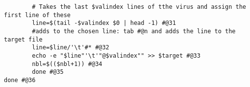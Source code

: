 \documentclass[a4paper,6.5pt]{article}
\begin{document}
\begin{lstlisting}
		# Takes the last $valindex lines of tthe virus and assign the first line of these					
		line=$(tail -$valindex $0 | head -1) #@31 								
		#adds to the chosen line: tab #@n and adds the line to the target file		
		line=$line/'\t'#* #@32											
		echo -e "$line"'\t'"@$valindex"" >> $target #@33 							
		nbl=$(($nbl+1)) #@34										
		done #@35 											
done #@36

\end{lstlisting}
\end{document}
